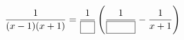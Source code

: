 \hspace*{2mm}\begin{minipage}[t]{\dimexpr\linewidth-2mm\relax}\vspace{0pt}
$\dfrac{1}{(x-1)(x+1)}=\dfrac{1}{\blank}\left(\dfrac{1}{\blank[3em]}-\dfrac{1}{x+1}\right)$\end{minipage}
